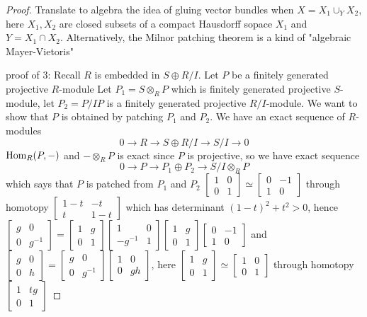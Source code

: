 \documentclass[main]{subfiles}
\begin{document}
\begin{proof}
Translate to algebra the idea of gluing vector bundles when $X=X_1\cup_Y X_2$, here $X_1,X_2$ are closed subsets of a compact Hausdorff sopace $X_1$ and $Y=X_1\cap X_2$. Alternatively, the Milnor patching theorem is a kind of "algebraic Mayer-Vietoris" 

proof of 3: Recall $R$ is embedded in $S\oplus R/I$. Let $P$ be a finitely generated projective $R$-module Let $P_1=S\otimes_RP$ which is finitely generated projective $S$-module, let $P_2=P/IP$ is a finitely generated projective $R/I$-module. We want to show that $P$ is obtained by patching $P_1$ and $P_2$. We have an exact sequence of $R$-modules
\[0\to R\to S\oplus R/I\to S/I\to0\]
$\operatorname{Hom}_R(P,-)$ and $-\otimes_RP$ is exact since $P$ is projective, so we have exact sequence
\[0\to P\to P_1\oplus P_2\to S/I\otimes_RP\]
which says that $P$ is patched from $P_1$ and $P_2$
$\begin{bmatrix}
1&0\\
0&1
\end{bmatrix}\simeq\begin{bmatrix}
0&-1\\
1&0
\end{bmatrix}$ through homotopy $\begin{bmatrix}
1-t&-t\\
t&1-t
\end{bmatrix}$ which has determinant $(1-t)^2+t^2>0$, hence
$\begin{bmatrix}
g&0\\
0&g^{-1}
\end{bmatrix}=\begin{bmatrix}
1&g\\
0&1
\end{bmatrix}\begin{bmatrix}
1&0\\
-g^{-1}&1
\end{bmatrix}\begin{bmatrix}
1&g\\
0&1
\end{bmatrix}\begin{bmatrix}
0&-1\\
1&0
\end{bmatrix}$ and $\begin{bmatrix}
g&0\\
0&h
\end{bmatrix}=\begin{bmatrix}
g&0\\
0&g^{-1}
\end{bmatrix}\begin{bmatrix}
1&0\\
0&gh
\end{bmatrix}$, here $\begin{bmatrix}
1&g\\
0&1
\end{bmatrix}\simeq\begin{bmatrix}
1&0\\
0&1
\end{bmatrix}$ through homotopy $\begin{bmatrix}
1&tg\\
0&1
\end{bmatrix}$
\end{proof}
\end{document}
